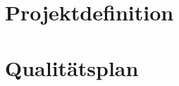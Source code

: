 \documentclass[a4paper,13pt]{scrreprt}
\begin{document}
\chapter{Projektdefinition}


\chapter{Qualitätsplan}

\end{document}
